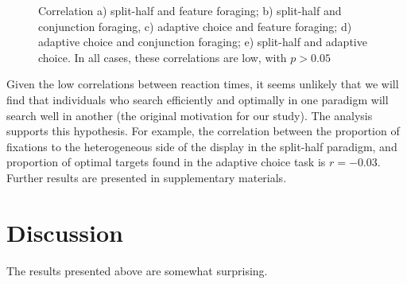 \documentclass[]{rsos}%
\begin{document}
\begin{figure}
\caption{Correlation a) split-half and feature foraging; b) split-half and conjunction foraging, c) adaptive choice and feature  foraging; d) adaptive choice and conjunction foraging; e) split-half and adaptive choice. In all cases, these correlations are low, with $p>0.05$}
\label{fig:between_para_rt}
\end{figure}

Given the low correlations between reaction times, it seems unlikely that we will find that individuals who search efficiently and optimally in one paradigm will search well in another (the original motivation for our study). The analysis supports this hypothesis. For example, the correlation between the proportion of fixations to the heterogeneous side of the display in the split-half paradigm, and proportion of optimal targets found in the adaptive choice task is $r=-0.03$. Further results are presented in supplementary materials. 

\section{Discussion}

The results presented above are somewhat surprising. 



\end{document}
